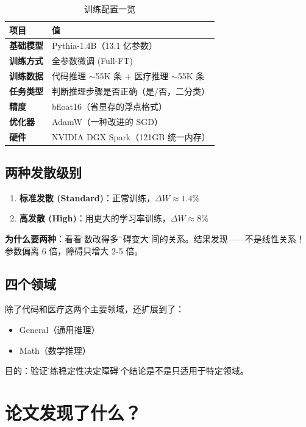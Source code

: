 \documentclass[12pt,a4paper]{article}
\begin{document}
\begin{table}[h]
\centering
\caption{训练配置一览}
\begin{tabular}{@{}>{\bfseries}ll@{}}
\toprule
项目 & 值 \\
\midrule
基础模型 & Pythia-1.4B（13.1 亿参数）\\
训练方式 & 全参数微调 (Full-FT)\\
训练数据 & 代码推理 $\sim$55K 条 + 医疗推理 $\sim$55K 条\\
任务类型 & 判断推理步骤是否正确（是/否，二分类）\\
精度 & bfloat16（省显存的浮点格式）\\
优化器 & AdamW（一种改进的 SGD）\\
硬件 & NVIDIA DGX Spark（121GB 统一内存）\\
\bottomrule
\end{tabular}
\end{table}

\subsection{两种发散级别}

\begin{enumerate}
    \item \textbf{标准发散 (Standard)}：正常训练，$\Delta W \approx 1.4\%$
    \item \textbf{高发散 (High)}：用更大的学习率训练，$\Delta W \approx 8\%$
\end{enumerate}

\textbf{为什么要两种}：看看\"参数改得多\"和\"障碍变大\"之间的关系。结果发现——不是线性关系！参数偏离 6 倍，障碍只增大 2-5 倍。

\subsection{四个领域}

除了代码和医疗这两个主要领域，还扩展到了：
\begin{itemize}
    \item General（通用推理）
    \item Math（数学推理）
\end{itemize}

目的：验证\"训练稳定性决定障碍\"这个结论是不是只适用于特定领域。

\section{论文发现了什么？}
\end{document}
